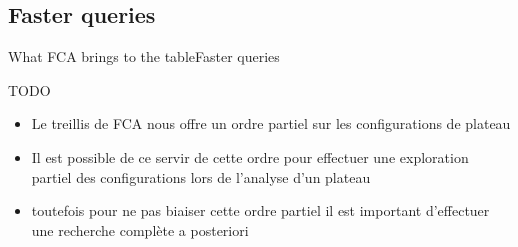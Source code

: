 %
\subsection{Faster queries}
\begin{frame}{What FCA brings to the table}{Faster queries}

TODO
  \begin{itemize}
    \item Le treillis de FCA nous offre un ordre partiel sur les
      configurations de plateau
    \item Il est possible de ce servir de cette ordre pour effectuer
      une exploration partiel des configurations lors de l'analyse
      d'un plateau
    \item toutefois pour ne pas biaiser cette ordre partiel il est
      important d'effectuer une recherche complète a posteriori
    
  \end{itemize}



\end{frame}

%
